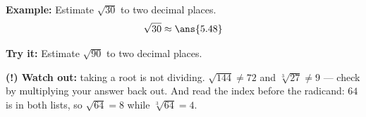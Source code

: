\documentclass[12pt]{article}
\begin{document}
\begin{examplebox}
\textbf{Example:} Estimate $\sqrt{30}$ to two decimal places.
\[ \sqrt{30} \approx \ans{5.48} \]
\end{examplebox}

\begin{tryitbox}
\textbf{Try it:} Estimate $\sqrt{90}$ to two decimal places.\\[2pt]
\end{tryitbox}

\begin{watchoutbox}
\textbf{(!) Watch out:} taking a root is not dividing. $\sqrt{144} \neq 72$ and
$\sqrt[3]{27} \neq 9$ --- check by multiplying your answer back out. And read
the index before the radicand: $64$ is in both lists, so $\sqrt{64} = 8$ while
$\sqrt[3]{64} = 4$.
\end{watchoutbox}
\end{document}
